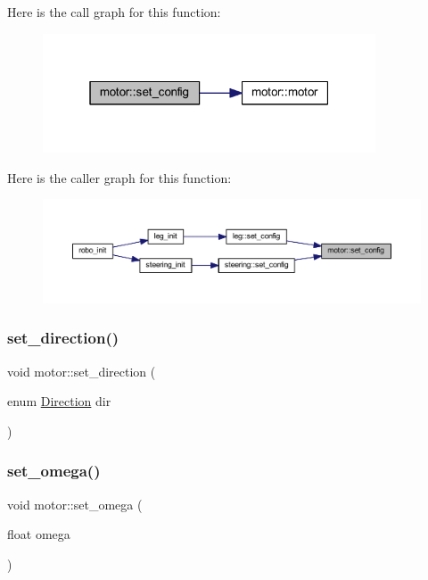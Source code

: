 Here is the call graph for this function\+:
\nopagebreak
\begin{figure}[H]
\begin{center}
\leavevmode
\includegraphics[width=280pt]{classmotor_a4580801b17e4b05384ab89ece8c3ca12_cgraph}
\end{center}
\end{figure}
Here is the caller graph for this function\+:
\nopagebreak
\begin{figure}[H]
\begin{center}
\leavevmode
\includegraphics[width=350pt]{classmotor_a4580801b17e4b05384ab89ece8c3ca12_icgraph}
\end{center}
\end{figure}
\mbox{\label{classmotor_a788528b29d950ce81e3e9a41eb1977a3}} 
\subsubsection{\texorpdfstring{set\_direction()}{set\_direction()}}
{\footnotesize\ttfamily void motor\+::set\+\_\+direction (\begin{DoxyParamCaption}\item[{enum \mbox{\hyperlink{motor_8h_a224b9163917ac32fc95a60d8c1eec3aa}{Direction}}}]{dir }\end{DoxyParamCaption})}

\mbox{\label{classmotor_aafd4845142b5d311ea73331b3ae1bb33}} 
\subsubsection{\texorpdfstring{set\_omega()}{set\_omega()}}
{\footnotesize\ttfamily void motor\+::set\+\_\+omega (\begin{DoxyParamCaption}\item[{float}]{omega }\end{DoxyParamCaption})}



